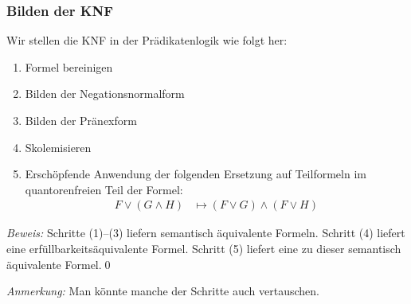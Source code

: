 \documentclass[aspectratio=1610,onlymath]{beamer}
\begin{document}
\begin{frame}\frametitle{Bilden der KNF}

Wir stellen die KNF in der Prädikatenlogik wie folgt her:
\begin{enumerate}[(1)]
\item Formel bereinigen
\item Bilden der Negationsnormalform
\item Bilden der Pränexform
\item Skolemisieren
\item Erschöpfende Anwendung der folgenden Ersetzung auf Teilformeln im quantorenfreien Teil der Formel:
\begin{align*}
F\vee(G\wedge H) &\mapsto (F\vee G)\wedge (F\vee H)
\end{align*}
\end{enumerate}\pause


\emph{Beweis:} Schritte (1)--(3) liefern semantisch äquivalente Formeln. Schritt (4) liefert eine erfüllbarkeitsäquivalente Formel. Schritt (5) liefert eine zu dieser semantisch äquivalente Formel.\qed\medskip

\emph{Anmerkung:} Man könnte manche der Schritte auch vertauschen.

\end{frame}
\end{document}
